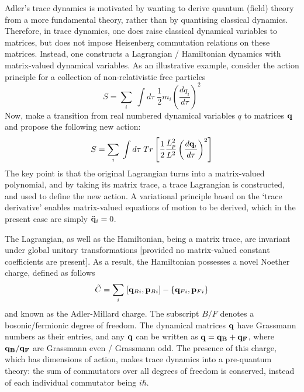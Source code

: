 \documentclass{iopconfser}
\begin{document}
Adler's trace dynamics is motivated by wanting to derive quantum (field) theory from a more fundamental theory, rather than by quantising classical dynamics.  Therefore, in trace dynamics, one does raise classical dynamical variables to matrices, but does not impose Heisenberg commutation relations on these matrices. Instead, one
constructs a   Lagrangian / Hamiltonian dynamics with matrix-valued dynamical variables. As an illustrative example, consider the action principle for a collection of non-relativistic free particles
\begin{equation}
S = \sum_i\;  \int d\tau \; \frac{1}{2}m_i\left(\frac{dq_i}{d\tau}\right)^2
\end{equation}
 Now, make a transition from real numbered dynamical variables $q$ to matrices $\bf q$ and propose the following new action:
 \begin{equation}
 S = \sum_i\;  \int d\tau \; Tr\left[ \frac{1}{2}\frac{L_{p}^2}{L^2}\left(\frac{d{\bf q}_i}{d\tau}\right)^2 \right]
\end{equation}
The key point is that the original Lagrangian turns into a matrix-valued polynomial, and by taking its matrix trace, a trace Lagrangian is constructed, and used to define the new action. A variational principle based on the `trace derivative' enables matrix-valued equations of motion to be derived, which in the present case are simply $\ddot{\bf q}_i =0$.

The Lagrangian, as well as the Hamiltonian, being a matrix trace, are invariant under global unitary transformations [provided no matrix-valued constant coefficients are present]. As a result, the Hamiltonian possesses a novel Noether charge, defined as follows
\begin{equation}\tilde{C} = \sum_i \; [{\bf q}_{Bi}, {\bf p}_{Bi}] -\left\{{\bf q}_{Fi},{\bf p}_{Fi}\right\}  \end{equation}
and known as the Adler-Millard charge. The subscript $B/F$ denotes a bosonic/fermionic degree of freedom. The dynamical matrices ${\bf q}$ have Grassmann numbers as their entries, and any $\bf q$ can be written as $\bf q = \bf q_B + \bf q_F$, where $\bf q_B / \bf q_F$ are Grassmann even / Grassmann odd. The presence of this charge, which has dimensions of action, makes trace dynamics into a pre-quantum theory: the sum of commutators over all degrees of freedom  is conserved, instead of each individual commutator being $i\hbar$.
\end{document}
